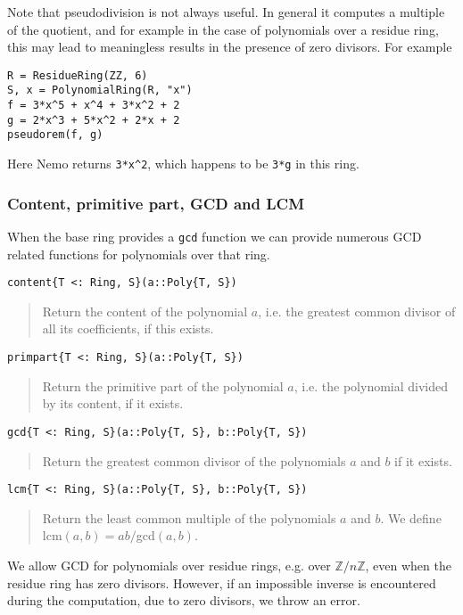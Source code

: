 \documentclass[a4paper,10pt]{article}
\newcommand{\Z}{\mathbb{Z}}
\newcommand{\code}{\lstinline}
\newcommand{\desc}[1]{\vspace{-3mm}\begin{quote}#1\end{quote}}
\begin{document}
{{Note that pseudodivision is not always useful. In general it computes a
multiple of the quotient, and for example in the case of polynomials over a
residue ring, this may lead to meaningless results in the presence of zero
divisors. For example

\begin{lstlisting}
R = ResidueRing(ZZ, 6)
S, x = PolynomialRing(R, "x")
f = 3*x^5 + x^4 + 3*x^2 + 2
g = 2*x^3 + 5*x^2 + 2*x + 2
pseudorem(f, g)
\end{lstlisting}

Here Nemo returns \code{3*x^2}, which happens to be \code{3*g} in this
ring.

\subsubsection{Content, primitive part, GCD and LCM}

When the base ring provides a \code{gcd} function we can provide numerous
GCD related functions for polynomials over that ring.

\begin{lstlisting}
content{T <: Ring, S}(a::Poly{T, S})
\end{lstlisting}

\desc{Return the content of the polynomial $a$, i.e. the greatest common divisor
of all its coefficients, if this exists.}

\begin{lstlisting}
primpart{T <: Ring, S}(a::Poly{T, S})
\end{lstlisting}

\desc{Return the primitive part of the polynomial $a$, i.e. the polynomial
divided by its content, if it exists.}

\begin{lstlisting}
gcd{T <: Ring, S}(a::Poly{T, S}, b::Poly{T, S})
\end{lstlisting}

\desc{Return the greatest common divisor of the polynomials $a$ and $b$ if 
it exists.}

\begin{lstlisting}
lcm{T <: Ring, S}(a::Poly{T, S}, b::Poly{T, S})
\end{lstlisting}

\desc{Return the least common multiple of the polynomials $a$ and $b$. We
define lcm$(a, b) = ab/$gcd$(a, b)$.}

We allow GCD for polynomials over residue rings, e.g. over $\Z/n\Z$, even when
the residue ring has zero divisors. However, if an impossible inverse is
encountered during the computation, due to zero divisors, we throw an error.

}}
\end{document}
